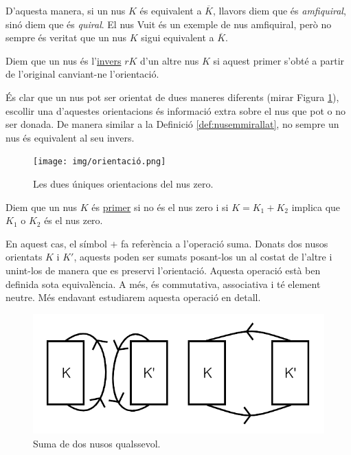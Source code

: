 D'aquesta manera, si un nus $K$ és equivalent a $\overline{K}$, llavors diem que és \textit{amfiquiral}, sinó diem que és \textit{quiral}. El nus Vuit és un exemple de nus amfiquiral, però no sempre és veritat que un nus $K$ sigui equivalent a $\overline{K}$.

\begin{definition}\label{def:nusinvers}
	Diem que un nus és l'\underline{invers} $rK$ d'un altre nus $K$ si aquest primer s'obté a partir de l'original canviant-ne l'orientació.
\end{definition}

És clar que un nus pot ser orientat de dues maneres diferents (mirar Figura \ref{fig:nusorientat}), escollir una d'aquestes orientacions és informació extra sobre el nus que pot o no ser donada. De manera similar a la Definició \ref{def:nusemmirallat}, no sempre un nus és equivalent al  seu invers.

\begin{figure}
	\centering
	\texttt{[image: img/orientació.png]}
	\caption{Les dues úniques orientacions del nus zero.}\label{fig:nusorientat}
\end{figure}

\begin{definition}
	Diem que un nus $K$ és \underline{primer} si no és el nus zero i si $K=K_1+K_2$ implica que $K_1$ o $K_2$ és el nus zero.
\end{definition}

En aquest cas, el símbol $+$ fa referència a l'operació suma. Donats dos nusos orientats $K$ i $K'$, aquests poden ser sumats posant-los un al costat de l'altre i unint-los de manera que es preservi l'orientació. Aquesta operació està ben definida sota equivalència. A més, és commutativa, associativa i té element neutre. Més endavant estudiarem aquesta operació en detall.\\

\begin{figure}
	\centering
	\includegraphics[width=0.9\linewidth]{img/nussuma.png}
	\caption{Suma de dos nusos qualssevol.}\label{fig:nussuma}
\end{figure}

